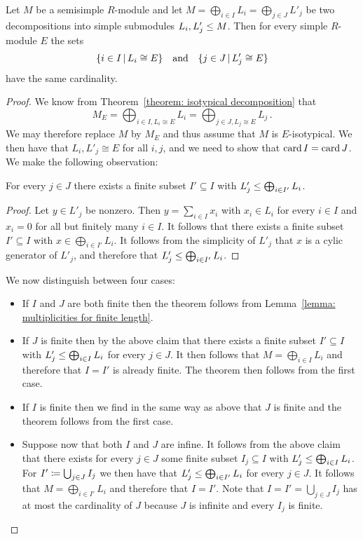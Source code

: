 \begin{theorem}
  \label{theorem: multiplicity well-defined}
  Let $M$ be a semisimple $R$-module and let $M = \bigoplus_{i \in I} L_i = \bigoplus_{j \in J} L'_j$ be two decompositions into simple submodules $L_i, L'_j \leq M$.
  Then for every simple $R$-module $E$ the sets
  \[
    \{ i \in I \suchthat L_i \cong E \}
    \quad\text{and}\quad
    \{ j \in J \suchthat L'_j \cong E \}
  \]
  have the same cardinality.
\end{theorem}


\begin{proof}
  We know from Theorem~\ref{theorem: isotypical decomposition} that
  \[
      M_E
    = \bigoplus_{i \in I, L_i \cong E} L_i
    = \bigoplus_{j \in J, L_j \cong E} L_j \,.
  \]
  We may therefore replace $M$ by $M_E$ and thus assume that $M$ is $E$-isotypical.
  We then have that $L_i, L'_j \cong E$ for all $i, j$, and we need to show that $\operatorname{card}{I} = \operatorname{card}{J}$.
  We make the following observation:
  
  \begin{claim}
    For every $j \in J$ there exists a finite subset $I' \subseteq I$ with $L'_j \leq \bigoplus_{i \in I'} L_i$.
  \end{claim}
  
  \begin{proof}
    Let $y \in L'_j$ be nonzero.
    Then $y = \sum_{i \in I} x_i$ with $x_i \in L_i$ for every $i \in I$ and $x_i = 0$ for all but finitely many $i \in I$.
    It follows that there exists a finite subset $I' \subseteq I$ with $x \in \bigoplus_{i \in I'} L_i$.
    It follows from the simplicity of $L'_j$ that $x$ is a cylic generator of $L'_j$, and therefore that $L'_j \leq \bigoplus_{i \in I'} L_i$.
  \end{proof}
  
  We now distinguish between four cases:
  \begin{itemize}
    \item 
      If $I$ and $J$ are both finite then the theorem follows from Lemma~\ref{lemma: multiplicities for finite length}.
    \item
      If $J$ is finite then by the above claim that there exists a finite subset $I' \subseteq I$ with $L'_j \leq \bigoplus_{i \in I} L_i$ for every $j \in J$.
      It then follows that $M = \bigoplus_{i \in I} L_i$ and therefore that $I = I'$ is already finite.
      The theorem then follows from the first case.
    \item
      If $I$ is finite then we find in the same way as above that $J$ is finite and the theorem follows from the first case.
    \item
      Suppose now that both $I$ and $J$ are infine.
      It follows from the above claim that there exists for every $j \in J$ some finite subset $I_j \subseteq I$ with $L'_j \leq \bigoplus_{i \in I} L_i$.
      For $I' \coloneqq \bigcup_{j \in J} I_j$ we then have that $L'_j \leq \bigoplus_{i \in I'} L_i$ for every $j \in J$.
      It follows that $M = \bigoplus_{i \in I'} L_i$ and therefore that $I = I'$.
      Note that $I = I' = \bigcup_{j \in J} I_j$ has at most the cardinality of $J$ because $J$ is infinite and every $I_j$ is finite.
      

\end{itemize}
\end{proof}
